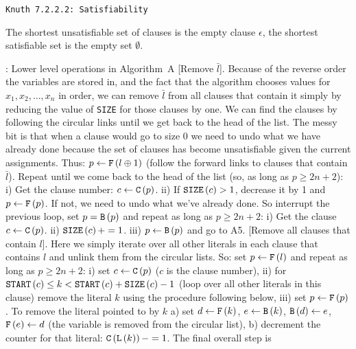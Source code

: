 \def\newstep#1{\smallskip \noindent {\bf #1}}
\def\newprob#1{\vskip 0.12in \noindent {\bf #1}}

\topglue 0.5in
\centerline{\tt Knuth 7.2.2.2: Satisfiability}
\vskip 0.3in

\newprob {Problem 1} The shortest unsatisfiable set of clauses is the
empty clause $\epsilon$, the shortest satisfiable set is the empty set $\emptyset$.

\newprob {Problem 121}: Lower level operations in Algorithm~A
\newstep {A3} [Remove $\bar l$].  Because of the reverse order the variables are
stored in, and the fact that the algorithm chooses values for $x_1, x_2, \ldots, x_n$
in order, we can remove $\bar l$ from all clauses that contain it simply by
reducing the value of {\tt SIZE} for those clauses by one.  We can find the clauses
by following the circular links until we get back to the head of the list.
The messy bit is that when a clause would go to size 0 we need to undo
what we have already done because the set of clauses has become unsatisfiable
given the current assignments.  Thus: $p \gets {\tt F}\left(l \oplus 1\right)$ 
(follow the forward links to clauses that contain $\bar l$).  Repeat until
we come back to the head of the list (so, as long as $p \ge 2 n + 2$):
i) Get the clause number: $c \gets {\tt C}\left(p\right)$. ii) If ${\tt SIZE}\left(c\right) > 1$,
 decrease it by 1 and $p \gets {\tt F}\left(p\right)$.  If not, we need to undo what
 we've already done.  So interrupt the previous
 loop, set $p = {\tt B}\left(p\right)$ and repeat as long as $p \ge 2 n + 2$:
 i) Get the clause $c \gets {\tt C}\left(p\right)$. ii) ${\tt SIZE}\left(c\right) += 1$.
 iii) $p \gets {\tt B}\left(p\right)$ and go to A5.
\newstep {A4} [Remove all clauses that contain $l$].  Here we simply iterate
over all other literals in each clause that contains $l$ and unlink them from
the circular lists.  So: set $p \gets {\tt F}\left(l\right)$ and repeat as
long as $p \ge 2 n + 2$: i) set $c \gets {\tt C}\left(p\right)$ ($c$ is
the clause number), ii) for ${\tt START}\left(c\right) \le k < {\tt START}\left(c\right)
 + {\tt SIZE}\left(c\right) - 1$ (loop over all other literals in this clause)
 remove the literal $k$ using the procedure following below, iii) set $p \gets {\tt F}\left(p\right)$.
 To remove the literal pointed to by $k$ a) set $d \gets {\tt F}\left(k\right)$,
 $e \gets {\tt B}\left(k\right)$, ${\tt B}\left(d\right) \gets e$, ${\tt F}\left(e\right) \gets d$
 (the variable is removed from the circular list), b) decrement the counter for that
 literal: ${\tt C}\left({\tt L}\left(k\right)\right) -= 1$. The final overall step is
